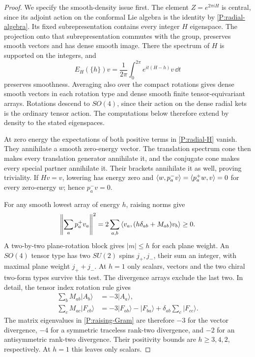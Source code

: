 \begin{proof}
We specify the smooth-density issue first.  The element
$Z=e^{2\pi iH}$ is central, since its adjoint action on the conformal
Lie algebra is the identity by \eqref{P:radial-algebra}.  Its fixed
subrepresentation contains every integer $H$ eigenspace.  The
projection onto that subrepresentation commutes with the group,
preserves smooth vectors and has dense smooth image.  There the
spectrum of $H$ is supported on the integers, and
\begin{equation}
 E_H(\{h\})v=\frac1{2\pi}\int_0^{2\pi}e^{it(H-h)}v\,\dd t
 \label{P:integer-projection}
\end{equation}
preserves smoothness.  Averaging also over the compact rotations gives
dense smooth vectors in each rotation type and dense smooth
finite tensor-equivariant arrays.  Rotations descend to $SO(4)$,
since their action on the dense radial kets is the ordinary tensor
action.  The computations below therefore extend by density to the
stated eigenspaces.

At zero energy the expectations of both positive terms in
\eqref{P:radial-H} vanish.  They annihilate a smooth zero-energy vector.
The translation spectrum cone then makes every translation generator
annihilate it, and the conjugate cone makes every special partner
annihilate it.  Their brackets annihilate it as well, proving
triviality.  If $Hv=v$, lowering has energy zero and
$\left\langle w,p_a^-v\right\rangle=\left\langle p_a^+w,v\right\rangle=0$ for every zero-energy $w$;
hence $p_a^-v=0$.

For any smooth lowest array of energy $h$, raising norms give
\begin{equation}
 \left\|\sum_a p_a^+v_a\right\|^2
   =2\sum_{a,b}\left\langle v_a,(h\delta_{ab}+M_{ab})v_b\right\rangle\geq0.
 \label{P:raising-Gram}
\end{equation}
A two-by-two plane-rotation block gives $|m|\leq h$ for each plane
weight.  An $SO(4)$ tensor type has two $SU(2)$ spins $j_+,j_-$, their
sum an integer, with maximal plane weight $j_++j_-$.  At $h=1$ only
scalars, vectors and the two chiral two-form types survive this test.
The divergence arrays exclude the last two.  In detail, the tensor
index rotation rule gives
\begin{align}
 \sum_bM_{ab}|A_b\rangle&=-3|A_a\rangle,\label{P:vector-Gram}\\
 \sum_cM_{ac}|F_{cb}\rangle
   &=-3|F_{ab}\rangle-|F_{ba}\rangle
                  +\delta_{ab}\sum_c|F_{cc}\rangle.
 \label{P:tensor-Gram}
\end{align}
The matrix eigenvalues in \eqref{P:raising-Gram} are therefore $-3$
for the vector divergence, $-4$ for a symmetric traceless rank-two
divergence, and $-2$ for an antisymmetric rank-two divergence.
Their positivity bounds are $h\geq3,4,2$, respectively.  At $h=1$
this leaves only scalars.


\end{proof}
